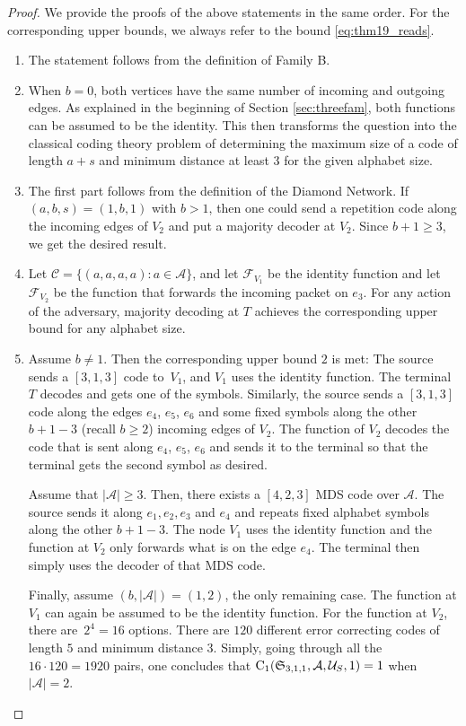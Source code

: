 \documentclass[11pt,a4paper]{article}
\theoremstyle{definition}
\newcommand{\mC}{\mathcal{C}}
\newcommand{\mA}{\mathcal{A}}
\newcommand{\mF}{\mathcal{F}}
\newcommand{\mU}{\mathcal{U}}
\newcommand{\CC}{\textnormal{C}}
\begin{document}
\begin{proof}
We provide the proofs of the above statements in the same order. For the corresponding upper bounds, we always refer to the bound \eqref{eq:thm19_reads}. 
\begin{enumerate}
    \item The statement follows from the definition of Family B.
    \item When $b=0$, both vertices have the same number of incoming and outgoing edges. As explained in the beginning of Section \ref{sec:threefam}, both functions can be assumed to be the identity. This then transforms the question into the classical coding theory problem of determining the maximum size of a code of length $a+s$ and minimum distance at least $3$ for the given alphabet size.  
    \item The first part follows from the definition of the Diamond Network. If $(a,b,s) = (1,b,1)$ with $b >1$, then one could send a repetition code along the incoming edges of $V_2$ and put a majority decoder at $V_2$. Since $b+1\ge 3$, we get the desired result.
    \item Let $\mC = \{(a,a,a,a): a \in \mA\}$, and let $\mF_{V_1}$ be the identity function and let $\mF_{V_2}$ be the function that forwards the incoming packet on $e_3$. For any action of the adversary, majority decoding at $T$ achieves the corresponding upper bound for any alphabet size.
    \item Assume $b \neq 1$. Then the corresponding upper bound $2$ is met: The source sends a $[3,1,3]$ code to~$V_1$, and $V_1$ uses the identity function. The terminal $T$ decodes and gets one of the symbols. Similarly, the source sends a $[3,1,3]$ code along the edges $e_4$, $e_5$,  $e_6$ and some fixed symbols along the other~$b+1-3$ (recall $b\ge 2$) incoming edges of $V_2$. The function of $V_2$ decodes the code that is sent along $e_4$, $e_5$, $e_6$ and sends it to the terminal so that the terminal gets the second symbol as desired. 
    
    Assume that $\lvert \mA \rvert \ge 3$. Then, there exists a $[4,2,3]$ MDS code over $\mA$. The source sends it along $e_1,e_2,e_3$ and $e_4$ and repeats fixed alphabet symbols along the other $b+1-3$. The node $V_1$ uses the identity function and the function at $V_2$ only forwards what is on the edge $e_4$. The terminal then simply uses the decoder of that MDS code. 
    
    Finally, assume $(b,\lvert \mA \rvert)=(1,2)$, the only remaining case. The function at $V_1$ can again be assumed to be the identity function. For the function at $V_2$, there are~$2^4=16$ options. There are $120$ different error correcting codes of length $5$ and minimum distance $3$. Simply, going through all the $16 \cdot 120 = 1920 $ pairs, one concludes that  $\CC_1(\mathfrak{S}_{3,1,1},\mA,\mU_S,1) = 1$ when $\lvert \mA \rvert=2$. \qedhere
\end{enumerate}
\end{proof}
\end{document}

